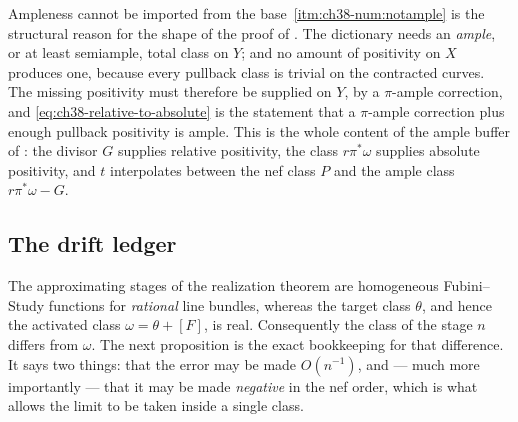 \begin{warning}{Ampleness cannot be imported from the base}
\label{warn:ch38-no-ample-from-base}
\,\cref{itm:ch38-num:notample} is the
structural reason for the shape of the proof of
.  The dictionary
 needs an \emph{ample}, or at least
semiample, total class on $Y$; and no amount of positivity on $X$
produces one, because every pullback class is trivial on the contracted
curves.  The missing positivity must therefore be supplied on $Y$, by a
$\pi$-ample correction, and \eqref{eq:ch38-relative-to-absolute} is the
statement that a $\pi$-ample correction plus enough pullback positivity
is ample.  This is the whole content of the ample buffer of
: the divisor $G$ supplies relative positivity, the
class $r\pi^*\omega$ supplies absolute positivity, and $t$ interpolates
between the nef class $P$ and the ample class $r\pi^*\omega-G$.
\end{warning}

\subsection{The drift ledger}
\label{sec:ch38-drift}

The approximating stages of the realization theorem are homogeneous
Fubini--Study functions for \emph{rational} line bundles, whereas the
target class $\theta$, and hence the activated class
$\omega=\theta+[F]$, is real.  Consequently the class of the stage
$n$ differs from $\omega$.  The next proposition is the exact
bookkeeping for that difference.  It says two things: that the error may be
made $O(n^{-1})$, and --- much more importantly --- that it may be made
\emph{negative} in the nef order, which is what allows the limit to be
taken inside a single class.

